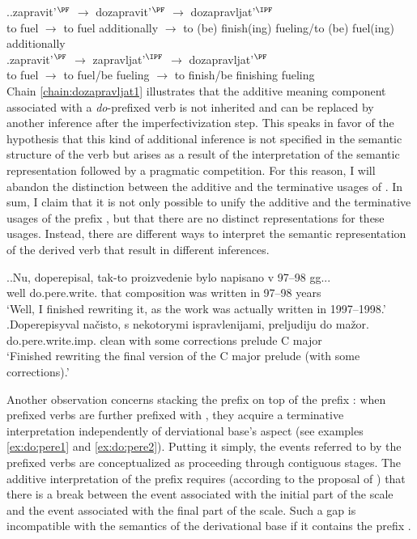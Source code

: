\ex.\label{chain:dozapravljat}\ag.\label{chain:dozapravljat1}zapravit'$^{\PF}$ $\rightarrow$ dozapravit'$^{\PF}$ $\rightarrow$ dozapravljat'$^{\IPF}$\\
{to fuel} $\rightarrow$ {to fuel additionally} $\rightarrow$ {to (be) finish(ing) fueling/to (be) fuel(ing) additionally}\\
\bg.\label{chain:dozapravljat2}zapravit'$^{\PF}$ $\rightarrow$ zapravljat'$^{\IPF}$ $\rightarrow$ dozapravljat'$^{\PF}$\\
{to fuel} $\rightarrow$ {to fuel/be fueling} $\rightarrow$ {to finish/be finishing fueling}\\

Chain \ref{chain:dozapravljat1} illustrates that the additive meaning component associated with a \textit{do}-prefixed verb is not inherited and can be replaced by another inference after the imperfectivization step. This speaks in favor of the hypothesis that this kind of additional inference is not specified in the semantic structure of the verb but arises as a result of the interpretation of the semantic representation followed by a pragmatic competition. For this reason, I will abandon the distinction between the additive and the terminative usages of . In sum, I claim that it is not only possible to unify the additive and the terminative usages of the prefix , but that there are no distinct representations for these usages. Instead, there are different ways to interpret the semantic representation of the derived verb that result in different inferences. 

\ex.\ag.\label{ex:do:pere1}Nu, doperepisal, tak-to proizvedenie bylo napisano v 97--98 gg...\\
well do.pere.write. that composition was written in 97--98 years\\
\trans `Well, I finished rewriting it, as the work was actually written in 1997--1998.'
\bg.\label{ex:do:pere2}Doperepisyval na\v{c}isto, s nekotorymi ispravlenijami, preljudiju do ma\v{z}or.\\
do.pere.write.imp. clean with some corrections prelude C major\\
\trans `Finished rewriting the final version of the C major prelude (with some corrections).'

Another observation concerns stacking the prefix  on top of the prefix  : when prefixed verbs are further prefixed with , they acquire a terminative interpretation independently of derviational base's aspect (see examples \ref{ex:do:pere1} and \ref{ex:do:pere2}). Putting it simply, the events referred to by the prefixed verbs are conceptualized as proceeding through contiguous stages. The additive interpretation of the prefix  requires (according to the proposal of \citealt{Kagan:book}) that there is a break between the event associated with the initial part of the scale and the event associated with the final part of the scale. Such a gap is incompatible with the semantics of the derivational base if it contains the prefix . 

